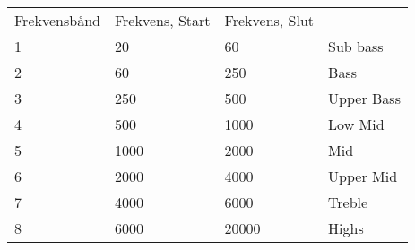 \begin{table}[H]
\begin{tabular}{llll}
Frekvensbånd            & Frekvens, Start           & Frekvens, Slut             &            \\ \cline{1-3}
\multicolumn{1}{|l|}{1} & \multicolumn{1}{l|}{20}   & \multicolumn{1}{l|}{60}    & Sub bass   \\ \cline{1-3}
\multicolumn{1}{|l|}{2} & \multicolumn{1}{l|}{60}   & \multicolumn{1}{l|}{250}   & Bass       \\ \cline{1-3}
\multicolumn{1}{|l|}{3} & \multicolumn{1}{l|}{250}  & \multicolumn{1}{l|}{500}   & Upper Bass \\ \cline{1-3}
\multicolumn{1}{|l|}{4} & \multicolumn{1}{l|}{500}  & \multicolumn{1}{l|}{1000}  & Low Mid    \\ \cline{1-3}
\multicolumn{1}{|l|}{5} & \multicolumn{1}{l|}{1000} & \multicolumn{1}{l|}{2000}  & Mid        \\ \cline{1-3}
\multicolumn{1}{|l|}{6} & \multicolumn{1}{l|}{2000} & \multicolumn{1}{l|}{4000}  & Upper Mid  \\ \cline{1-3}
\multicolumn{1}{|l|}{7} & \multicolumn{1}{l|}{4000} & \multicolumn{1}{l|}{6000}  & Treble \\ \cline{1-3}
\multicolumn{1}{|l|}{8} & \multicolumn{1}{l|}{6000} & \multicolumn{1}{l|}{20000} & Highs      \\ \cline{1-3}
\end{tabular}
\end{table}